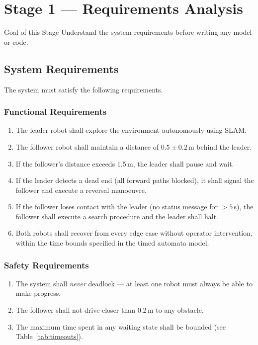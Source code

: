 \documentclass[11pt, a4paper]{article}
\begin{document}
\newpage
\section{Stage 1 — Requirements Analysis}

\begin{infobox}{Goal of this Stage}
Understand the system requirements before writing any model or code.
\end{infobox}

\subsection{System Requirements}

The system must satisfy the following requirements.

\subsubsection{Functional Requirements}

\begin{enumerate}[label=\textbf{FR\arabic*.}]
  \item The leader robot shall explore the environment autonomously using SLAM.
  \item The follower robot shall maintain a distance of $0.5 \pm 0.2$\,m behind the leader.
  \item If the follower's distance exceeds 1.5\,m, the leader shall pause and wait.
  \item If the leader detects a dead end (all forward paths blocked), it shall signal
        the follower and execute a reversal manoeuvre.
  \item If the follower loses contact with the leader (no status message for $> 5$\,s),
        the follower shall execute a search procedure and the leader shall halt.
  \item Both robots shall recover from every edge case without operator intervention,
        within the time bounds specified in the timed automata model.
\end{enumerate}

\subsubsection{Safety Requirements}

\begin{enumerate}[label=\textbf{SR\arabic*.}]
  \item The system shall \emph{never} deadlock — at least one robot must always be
        able to make progress.
  \item The follower shall not drive closer than 0.2\,m to any obstacle.
  \item The maximum time spent in any waiting state shall be bounded (see Table~\ref{tab:timeouts}).
\end{enumerate}
\end{document}
